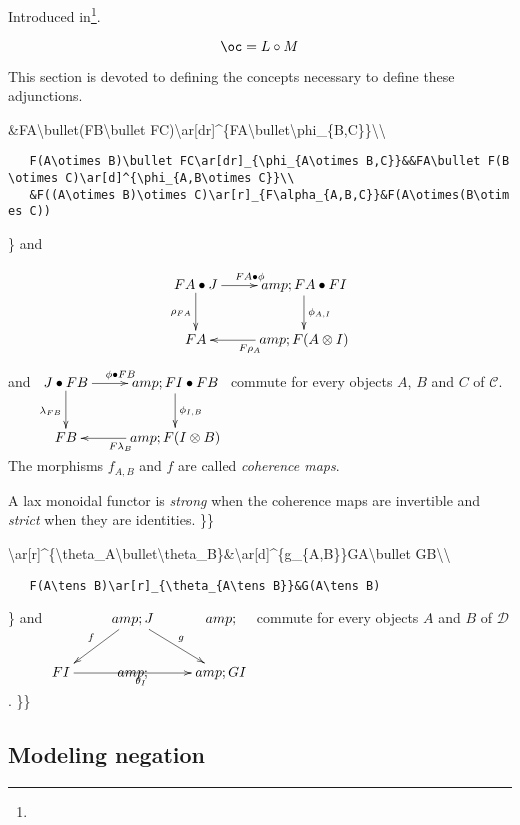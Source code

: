 Introduced in\footnote{}.

\todo[citation]

\[\oc=L\circ M\]

This section is devoted to defining the concepts necessary to define
these adjunctions.

\&FA\textbackslash{}bullet(FB\textbackslash{}bullet
FC)\textbackslash{}ar{[}dr{]}\^{}\{FA\textbackslash{}bullet\textbackslash{}phi\_\{B,C\}\}\textbackslash{}\textbackslash{}

\texttt{~~~F(A\textbackslash{}otimes~B)\textbackslash{}bullet~FC\textbackslash{}ar{[}dr{]}\_\{\textbackslash{}phi\_\{A\textbackslash{}otimes~B,C\}\}\&\&FA\textbackslash{}bullet~F(B\textbackslash{}otimes~C)\textbackslash{}ar{[}d{]}\^{}\{\textbackslash{}phi\_\{A,B\textbackslash{}otimes~C\}\}\textbackslash{}\textbackslash{}}\\
\texttt{~~~\&F((A\textbackslash{}otimes~B)\textbackslash{}otimes~C)\textbackslash{}ar{[}r{]}\_\{F\textbackslash{}alpha\_\{A,B,C\}\}\&F(A\textbackslash{}otimes(B\textbackslash{}otimes~C))}

\} and

\[\xymatrix{
    FA\bullet J\ar[d]_{\rho_{FA}}\ar[r]^{FA\bullet\phi}&amp;FA\bullet FI\ar[d]^{\phi_{A,I}}\\
    FA&amp;\ar[l]^{F\rho_A}F(A\otimes I)
}\] and \(\xymatrix{
    J\bullet FB\ar[d]_{\lambda_{FB}}\ar[r]^{\phi\bullet FB}&amp;FI\bullet FB\ar[d]^{\phi_{I,B}}\\
    FB&amp;\ar[l]^{F\lambda_B}F(I\otimes B)
}\) commute for every objects \(A\), \(B\) and \(C\) of \(\mathcal{C}\).
The morphisms \(f_{A,B}\) and \(f\) are called \emph{coherence maps}.

A lax monoidal functor is \emph{strong} when the coherence maps are
invertible and \emph{strict} when they are identities. \}\}

\textbackslash{}ar{[}r{]}\^{}\{\textbackslash{}theta\_A\textbackslash{}bullet\textbackslash{}theta\_B\}\&\textbackslash{}ar{[}d{]}\^{}\{g\_\{A,B\}\}GA\textbackslash{}bullet
GB\textbackslash{}\textbackslash{}

\texttt{~~~F(A\textbackslash{}tens~B)\textbackslash{}ar{[}r{]}\_\{\textbackslash{}theta\_\{A\textbackslash{}tens~B\}\}\&G(A\textbackslash{}tens~B)}

\} and \(\xymatrix{
  &amp;\ar[dl]_{f}J\ar[dr]^{g}&amp;\\
  FI\ar[rr]_{\theta_I}&amp;&amp;GI
}\) commute for every objects \(A\) and \(B\) of \(\mathcal{D}\). \}\}

\subsection{Modeling negation}\label{modeling-negation}

